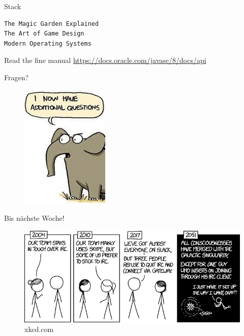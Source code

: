\documentclass[18pt]{beamer}
\begin{document}
\begin{frame}[fragile]{Stack}
    \begin{exampleblock}{}
        \begin{lstlisting}[language=Java]
The Magic Garden Explained
The Art of Game Design
Modern Operating Systems
        \end{lstlisting}
    \end{exampleblock}

\end{frame}

\begin{frame}{Read the fine manual}
    \Large{\url{https://docs.oracle.com/javase/8/docs/api}}
\end{frame}

\appendix
\beginbackup

\begin{frame}{Fragen?}
    \begin{figure}
        \includegraphics[scale=.6]{img/additionalquestions.jpg}
    \end{figure}
\end{frame}

\begin{frame}{Bis nächste Woche!}
    \begin{figure}
        \includegraphics[scale=.4]{img/team_chat.png}
        \caption{\footnotesize{xkcd.com}}
    \end{figure}
\end{frame}

\backupend
\end{document}
